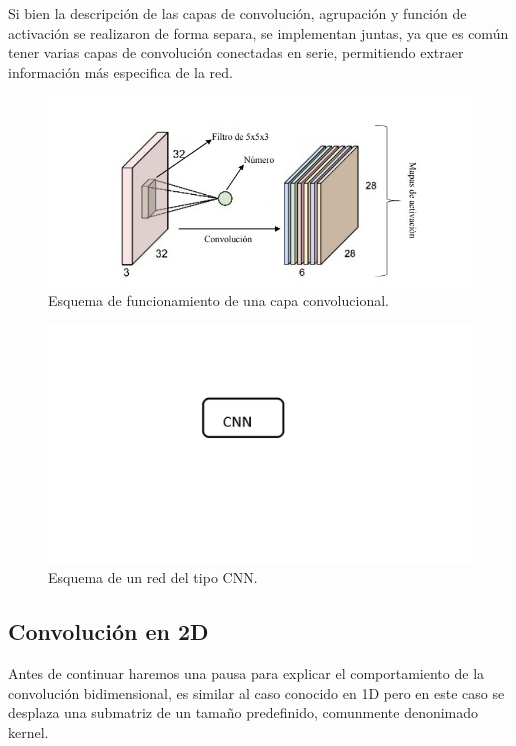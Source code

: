 Si bien la descripción de las capas de convolución, agrupación y función de activación se realizaron de forma separa, se implementan juntas, ya que es común tener varias capas de convolución conectadas en serie, permitiendo extraer información más especifica de la red.

\begin{figure}
    \centering
    \includegraphics[width=1\textwidth]{imgs/capa-convolucional.jpeg}
    \caption{Esquema de funcionamiento de una capa convolucional.}
    \label{fig:esquema-capa-convolucional}
\end{figure}
\begin{figure}
    \centering
    \includegraphics[width=1\textwidth]{imgs/CNN-completa.jpg}
    \caption{Esquema de un red del tipo CNN.}
    \label{fig:esquema-CNN}
\end{figure}

\subsection{Convolución en 2D}

Antes de continuar haremos una pausa para explicar el comportamiento de la convolución bidimensional, es similar al caso conocido en 1D pero
en este caso se desplaza una submatriz de un tamaño predefinido, comunmente denonimado kernel.


